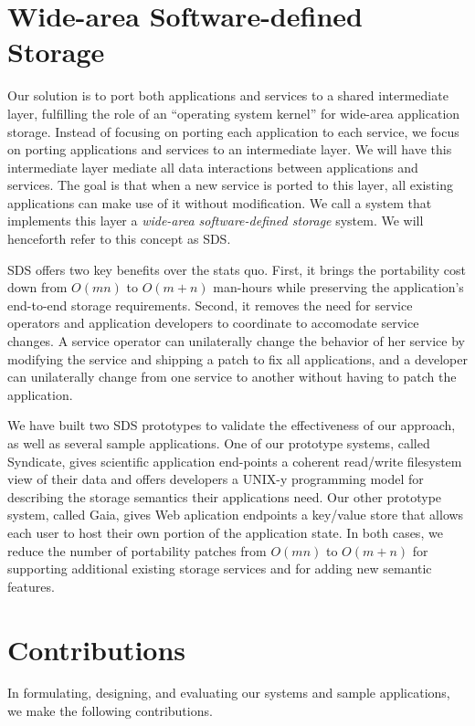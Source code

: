 \section{Wide-area Software-defined Storage}

Our solution is to port both applications and services to a shared
intermediate layer, fulfilling the role of an ``operating system kernel'' for
wide-area application storage.  Instead of focusing on
porting each application to each service, we focus on porting applications and
services to an intermediate layer.  We will have this intermediate layer mediate all
data interactions between applications and services.  The goal is that when a new service
is ported to this layer, all existing applications can make use of it without
modification.  We call a system that implements this layer a
\textit{wide-area software-defined storage} system.  We will henceforth refer to
this concept as SDS.

SDS offers two key benefits over the stats quo.  First, it brings the portability cost down from
$O(mn)$ to $O(m + n)$ man-hours while preserving the application's end-to-end
storage requirements.  Second, it removes the need for service operators and
application developers to coordinate to accomodate service changes.  A service operator can
unilaterally change the behavior of her service by modifying the service and
shipping a patch to fix all applications, and a developer can unilaterally
change from one service to another without having to patch the application.

We have built two SDS prototypes to validate the effectiveness of our approach,
as well as several sample applications.  One of our prototype
systems, called Syndicate, gives scientific application end-points a coherent read/write
filesystem view of their data and offers developers a UNIX-y programming model
for describing the storage semantics their applications need.  Our other
prototype system, called Gaia, gives Web aplication endpoints a key/value store
that allows each user to host their own portion of the application state.
In both cases, we reduce the number of portability patches from $O(mn)$ to $O(m + n)$
for supporting additional existing storage services and for adding new semantic
features.

\section{Contributions}

In formulating, designing, and evaluating our systems and sample applications,
we make the following contributions.

